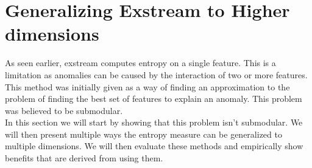 \documentclass[oneside, a4paper, onecolumn, 11pt]{article}
\begin{document}
\section{Generalizing Exstream to Higher dimensions}
As seen earlier, exstream computes entropy on a single feature. This is a limitation as anomalies can be caused by the interaction of two or more features. This method was initially given as a way of finding an approximation to the problem of finding the best set of features to explain an anomaly. This problem was believed to be submodular.\\
In this section we will start by showing that this problem isn't submodular. We will then present multiple ways the entropy measure can be generalized to multiple dimensions. We will then evaluate these methods and empirically show benefits that are derived from using them.\\
\end{document}
